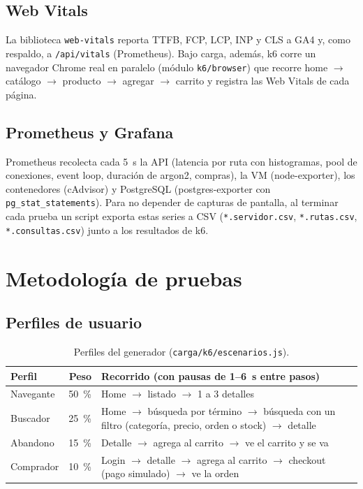\documentclass[11pt,a4paper]{article}
\newcommand{\codigo}[1]{\texttt{#1}}
\begin{document}
\subsection{Web Vitals}
La biblioteca \codigo{web-vitals} reporta TTFB, FCP, LCP, INP y CLS a GA4 y,
como respaldo, a \codigo{/api/vitals} (Prometheus). Bajo carga, además, k6 corre
un navegador Chrome real en paralelo (módulo \codigo{k6/browser}) que recorre
home $\rightarrow$ catálogo $\rightarrow$ producto $\rightarrow$ agregar
$\rightarrow$ carrito y registra las Web Vitals de cada página.

\subsection{Prometheus y Grafana}
Prometheus recolecta cada 5~s la API (latencia por ruta con histogramas, pool de
conexiones, event loop, duración de argon2, compras), la VM (node-exporter), los
contenedores (cAdvisor) y PostgreSQL (postgres-exporter con
\codigo{pg\_stat\_statements}). Para no depender de capturas de pantalla, al
terminar cada prueba un script exporta estas series a CSV
(\codigo{*.servidor.csv}, \codigo{*.rutas.csv}, \codigo{*.consultas.csv}) junto a
los resultados de k6.

\section{Metodología de pruebas}

\subsection{Perfiles de usuario}
\begin{table}[H]
\centering\small
\begin{tabularx}{\textwidth}{@{}lrX@{}}
\toprule
Perfil & Peso & Recorrido (con pausas de 1--6~s entre pasos) \\
\midrule
Navegante & 50~\% & Home $\rightarrow$ listado $\rightarrow$ 1 a 3 detalles \\
Buscador & 25~\% & Home $\rightarrow$ búsqueda por término $\rightarrow$ búsqueda con un filtro (categoría, precio, orden o stock) $\rightarrow$ detalle \\
Abandono & 15~\% & Detalle $\rightarrow$ agrega al carrito $\rightarrow$ ve el carrito y se va \\
Comprador & 10~\% & Login $\rightarrow$ detalle $\rightarrow$ agrega al carrito $\rightarrow$ checkout (pago simulado) $\rightarrow$ ve la orden \\
\bottomrule
\end{tabularx}
\caption{Perfiles del generador (\codigo{carga/k6/escenarios.js}).}
\end{table}
\end{document}
